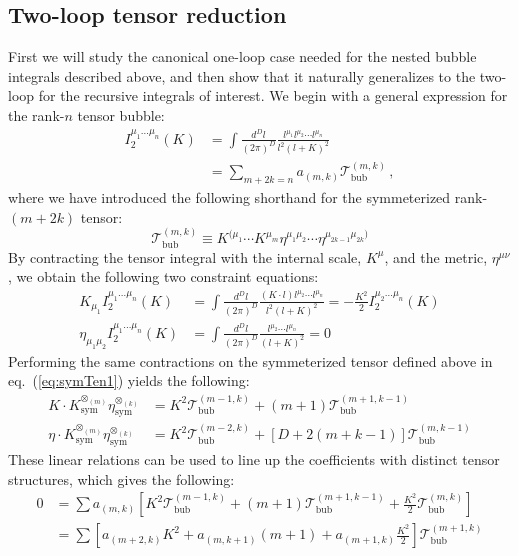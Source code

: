 \documentclass[12pt,letter]{article}
\def\eqn#1{eq.~(\ref{#1})}
\begin{document}
\subsection{Two-loop tensor reduction}\label{sec:tenRed}
First we will study the canonical one-loop case needed for the nested bubble integrals described above, and then show that it naturally generalizes to the two-loop for the recursive integrals of interest. We begin with a general expression for the rank-$n$ tensor bubble:
\begin{align}
     I^{\mu_1\dots \mu_n}_2(K)&= \int \frac{d^D l}{(2\pi)^D} \frac{l^{\mu_1}l^{\mu_2}\cdots l^{\mu_n} }{l^2(l+K)^2}
     \\
     &= \sum_{m+2k=n}a_{(m,k)} \mathcal{T}^{(m,k)}_{\text{bub}} \,,\label{tensorReductionBubble}
\end{align}
where we have introduced the following shorthand for the symmeterized rank-$(m+2k)$ tensor:
\begin{equation}\label{eq:symTen1}
\mathcal{T}^{(m,k)}_{\text{bub}}  \equiv K^{(\mu_1}\cdots K^{\mu_m}\eta^{\mu_1\mu_2}\cdots \eta^{\mu_{2k-1}\mu_{2k})}
\end{equation}
By contracting the tensor integral with the internal scale, $K^\mu$, and the metric, $\eta^{\mu\nu}$, we obtain the following two constraint equations:
\begin{align}
K_{\mu_1}I^{\mu_1\dots \mu_n}_2(K) &= \int \frac{d^D l}{(2\pi)^D} \frac{ (K\cdot l) l^{\mu_2}\cdots l^{\mu_n}}{l^2(l+K)^2}= -\frac{K^2}{2}I^{\mu_2\dots \mu_n}_2(K) 
\\
\eta_{\mu_1 \mu_2}I^{\mu_1\dots \mu_n}_2(K)&= \int \frac{d^D l}{(2\pi)^D} \frac{  l^{\mu_2}\cdots l^{\mu_n}}{(l+K)^2}=0
\end{align}
Performing the same contractions on the symmeterized tensor defined above in \eqn{eq:symTen1} yields the following:
\begin{align}
K\cdot K^{\otimes_{(m)}}_{\text{sym}}\eta_{\text{sym}}^{\otimes_{(k)}} &= K^2 \mathcal{T}^{(m-1,k)}_{\text{bub}} + (m+1)\mathcal{T}^{(m+1,k-1)}_{\text{bub}}
\\
\eta \cdot K^{\otimes_{(m)}}_{\text{sym}}\eta_{\text{sym}}^{\otimes_{(k)}} &= K^2 \mathcal{T}^{(m-2,k)}_{\text{bub}} + \left[D+2(m+k-1)\right]\mathcal{T}^{(m,k-1)}_{\text{bub}}
\end{align}
These linear relations can be used to line up the coefficients with distinct tensor structures, which gives the following:
\begin{align}
0&= \sum a_{(m,k)}\left[K^2 \mathcal{T}^{(m-1,k)}_{\text{bub}}+ (m+1)\mathcal{T}^{(m+1,k-1)}_{\text{bub}} +\frac{K^2}{2}\mathcal{T}^{(m,k)}_{\text{bub}}\right]
\\
&= \sum \left[a_{(m+2,k)} K^2 + a_{(m,k+1)} (m+1) +a_{(m+1,k)}\frac{K^2}{2}\right]\mathcal{T}^{(m+1,k)}_{\text{bub}}\end{align}
\end{document}
